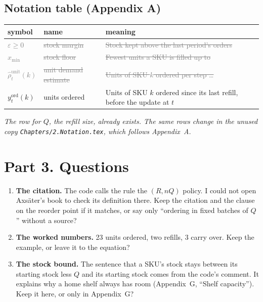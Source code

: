 \documentclass[11pt,a4paper]{article}
\newcommand{\new}[1]{\textcolor{newc}{#1}}
\newcommand{\old}[1]{\textcolor{gray}{\sout{#1}}}
\newcommand{\mockup}[1]{\textit{#1}}
\begin{document}
\subsection*{Notation table (Appendix A)}
\begin{center}
\begin{tabular}{lll}
\toprule
symbol & name & meaning \\
\midrule
\old{$\varepsilon \ge 0$} & \old{stock margin} & \old{Stock kept above the last period's orders} \\
\old{$x_{\min}$} & \old{stock floor} & \old{Fewest units a SKU is filled up to} \\
\old{$\hat\rho^{\mathrm{unit}}_t(k)$} & \old{unit demand estimate} & \old{Units of SKU $k$ ordered per step \ldots} \\
\new{$y^{\mathrm{ord}}_t(k)$} & \new{units ordered} & \new{Units of SKU $k$ ordered since its last refill, before the update at $t$} \\
\bottomrule
\end{tabular}
\end{center}
\mockup{The row for $Q$, the refill size, already exists. The same rows change in the unused copy
\texttt{Chapters/2.Notation.tex}, which follows Appendix~A.}

\section*{Part 3. Questions}
\begin{enumerate}[leftmargin=1.4em]
\item \textbf{The citation.} The code calls the rule the $(R, nQ)$ policy. I could not open Axs\"ater's
  book to check its definition there. Keep the citation and the clause on the reorder point if it
  matches, or say only ``ordering in fixed batches of $Q$'' without a source?
\item \textbf{The worked numbers.} 23 units ordered, two refills, 3 carry over. Keep the example, or
  leave it to the equation?
\item \textbf{The stock bound.} The sentence that a SKU's stock stays between its starting stock less
  $Q$ and its starting stock comes from the code's comment. It explains why a home shelf always has
  room (Appendix~G, ``Shelf capacity''). Keep it here, or only in Appendix~G?
\end{enumerate}
\end{document}
